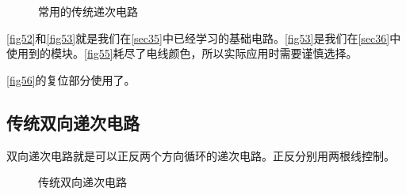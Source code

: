 \begin{figure}[!ht]
	\caption{常用的传统递次电路}
\end{figure}

\autoref{fig52}和\autoref{fig53}就是我们在\autoref{sec35}中已经学习的基础电路。\autoref{fig53}是我们在\autoref{sec36}中使用到的模块。\autoref{fig55}耗尽了电线颜色，所以实际应用时需要谨慎选择。

\autoref{fig56}的复位部分使用了。

\subsection{传统双向递次电路}\label{sec3}
双向递次电路就是可以正反两个方向循环的递次电路。正反分别用两根线控制。

\begin{figure}[!ht]
    \centering
	\qquad
	\qquad
	\caption{传统双向递次电路}
\end{figure}

